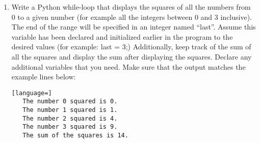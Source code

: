 \documentclass[12pt]{article}
\begin{document}
\begin{enumerate}
      \begin{lstlisting}[language=]
   Hello!
   Again (y/n)? #/*\textbf{y}*/
   Hello!
   Again (y/n)? #/*\textbf{y}*/
   Hello!
   Again (y/n)? #/*\textbf{n}*/
   Goodbye!
      \end{lstlisting}

      \vfill
      \newpage

   \item Write a Python while-loop that displays the squares of all the numbers
      from 0 to a given number (for example all the integers between 0 and 3
      inclusive). The end of the range will be specified in an integer named
      ``last''. Assume this variable has been declared and initialized earlier
      in the program to the desired values (for example: last = 3;)
      Additionally, keep track of the sum of all the squares and display the
      sum after displaying the squares. Declare any additional variables that
      you need.  Make sure that the output matches the example lines below:

      \begin{lstlisting}[language=]
   The number 0 squared is 0.
   The number 1 squared is 1.
   The number 2 squared is 4.
   The number 3 squared is 9.
   The sum of the squares is 14.
      \end{lstlisting}
\end{enumerate}
\end{document}
